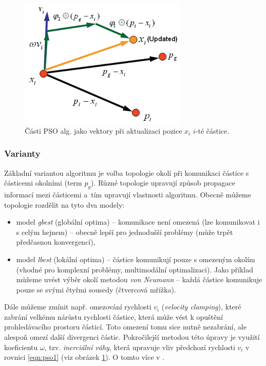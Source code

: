 \documentclass[a4paper,12pt]{article}
\begin{document}
\begin{figure}[here]
  \centering
  \includegraphics[width=8cm]{./img/pso_vectors.png}
  \caption{Části PSO alg. jako vektory při aktualizaci pozice $x_i$ $i$-té částice.}
  \label{fig:psovec}
\end{figure}

\subsubsection{Varianty}
Základní variantou algoritmu je volba topologie okolí při komunikaci částice s částicemi okolními (term $p_g$).
Různé topologie upravují způsob propagace informací mezi částicemi a~tím upravují vlastnosti algoritmu.
Obecně můžeme topologie rozdělit na tyto dva modely:
\begin{itemize}
  \item model {\it gbest} (globální optima) -- komunikace není omezená (lze komunikovat i s celým hejnem) --
  obecně lepší pro jednodušší problémy (může trpět předčasnou konvergencí),
  \item model {\it lbest} (lokální optima) -- částice komunikují pouze s omezeným okolím (vhodné pro komplexní
  problémy, multimodální optimalizaci). Jako příklad můžeme uvést výběr okolí metodou {\it von Neumann} --
  každá částice komunikuje pouze se svými čtyřmi sousedy (čtvercová mřížka).
\end{itemize}

Dále můžeme zmínit např. omezování rychlosti $v_i$ ({\it velocity clamping}), které zabrání velkému nárůstu
rychlosti částice, která může vést k opuštění prohledávacího prostoru částicí. Toto omezení tomu sice
nutně nezabrání, ale alespoň omezí další divergenci částic. Pokročilejší metodou této úpravy je využití koeficientu
$\omega$, tzv. {\it inerciální váhy}, která upravuje vliv předchozí rychlosti $v_i$ v rovnici \ref{eqn:pso1}
(viz obrázek \ref{fig:psovec}). O tomto více v \cite{Blum08SwarmOpt}.
\end{document}
